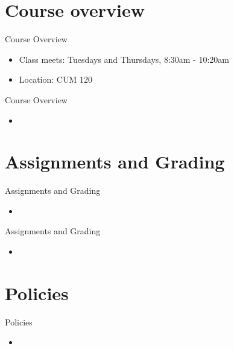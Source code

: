 \documentclass{beamer}
\begin{document}
\section{Course overview}


\begin{frame}{Course Overview}
    \begin{itemize}
        \item Class meets: Tuesdays and Thursdays, 8:30am - 10:20am
        \item Location: CUM 120
    \end{itemize}
\end{frame}

\begin{frame}{Course Overview}
    \begin{itemize}
        \item 
    \end{itemize}
\end{frame}

\section{Assignments and Grading}
\begin{frame}{Assignments and Grading}
    \begin{itemize}
        \item
    \end{itemize}
\end{frame}     

\begin{frame}{Assignments and Grading}
    \begin{itemize}
        \item
    \end{itemize}
\end{frame}

\section{Policies}
\begin{frame}{Policies}
    \begin{itemize}
        \item
    \end{itemize}
\end{frame}
\end{document}
